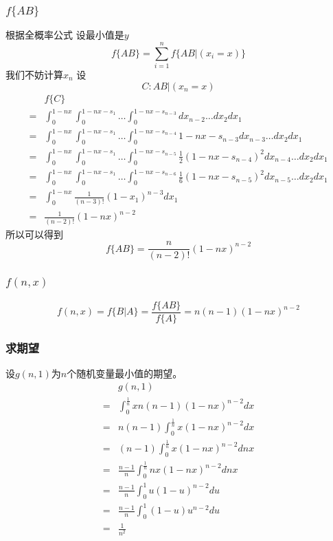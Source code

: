 \documentclass[11pt,a4paper]{article}
\begin{document}
\subsubsection{$f \lbrace AB \rbrace$}
根据全概率公式
设最小值是$y$
\[
	f\lbrace AB \rbrace = \sum_{i=1}^{n} f\lbrace AB|(x_i=x) \rbrace 
\]
我们不妨计算$x_n$
设
\[
	C:AB|(x_n=x)
\]
$$
\begin{array}{rl}
		& f\lbrace C \rbrace  \\
	=	& \int_{0}^{1-nx} \int_{0}^{1-nx-s_1} \dots \int_{0}^{1-nx-s_{n-3}} dx_{n-2} \dots dx_2 dx_1 \\
	= 	& \int_{0}^{1-nx} \int_{0}^{1-nx-s_1} \dots \int_{0}^{1-nx-s_{n-4}} 1-nx-s_{n-3} dx_{n-3} \dots dx_2 dx_1 \\
	=  	& \int_{0}^{1-nx} \int_{0}^{1-nx-s_1} \dots \int_{0}^{1-nx-s_{n-5}} \frac{1}{2} (1-nx-s_{n-4})^{2} dx_{n-4} \dots dx_2 dx_1 \\
	=	& \int_{0}^{1-nx} \int_{0}^{1-nx-s_1} \dots \int_{0}^{1-nx-s_{n-6}} \frac{1}{6} (1-nx-s_{n-5})^{2} dx_{n-5} \dots dx_2 dx_1 \\
	=	& \int_{0}^{1-nx} \frac{1}{(n-3)!} (1-x_1)^{n-3} dx_1 \\ 
	=	& \frac{1}{(n-2)!}(1-nx)^{n-2}
\end{array}
$$	
所以可以得到
\[
	f\lbrace AB \rbrace = \frac{n}{(n-2)!}(1-nx)^{n-2}
\]

\subsubsection{$f(n,x)$}
\[
	f(n,x)=f\lbrace B|A \rbrace=\frac{f\lbrace AB \rbrace}{f \lbrace A \rbrace}=n(n-1)(1-nx)^{n-2}
\]

\subsubsection{求期望}
设$g(n,1)$为$n$个随机变量最小值的期望。
$$
\begin{array}{rl}
	& g(n,1) \\
=	& \int_{0}^{\frac{1}{n}} xn(n-1)(1-nx)^{n-2} dx \\
=	& n(n-1)\int_{0}^{\frac{1}{n}} x(1-nx)^{n-2} dx \\
=	& (n-1) \int_{0}^{\frac{1}{n}} x(1-nx)^{n-2} dnx \\
=	& \frac{n-1}{n} \int_{0}^{\frac{1}{n}} nx(1-nx)^{n-2} dnx \\
=	& \frac{n-1}{n} \int_{0}^{1} u(1-u)^{n-2} du \\
=	& \frac{n-1}{n} \int_{0}^{1} (1-u)u^{n-2} du \\
=	& \frac{1}{n^2}  
\end{array}
$$
\end{document}
